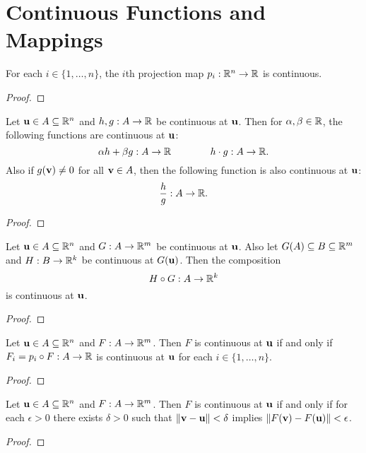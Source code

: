\documentclass[letterpaper, twoside, 12pt]{book}
\begin{document}
\section{Continuous Functions and Mappings}

\begin{proposition}[11.1]
  For each \(i\in\{1,\dots,n\}\), the \(i\)th projection map
  \(p_i:\mathbb R^n\to\mathbb R\) is continuous.
\end{proposition}
\begin{proof}

\end{proof}

\begin{theorem}[11.3]
  Let \(\mathbf u\in A\subseteq \mathbb R^n\) and \(h,g:A\to\mathbb R\) be continuous
  at \(\mathbf u\). Then for \(\alpha,\beta\in\mathbb R\), the following functions
  are continuous at \(\mathbf u\):
  \[
    \alpha h+\beta g : A\to\mathbb R
      \hspace{4em}
    h\cdot g : A\to\mathbb R
  .\]
  Also if \(g(\mathbf v)\not=0\) for all \(\mathbf v\in A\), then the following
  function is also continuous at \(\mathbf u\):
  \[
    \frac{h}{g} : A\to\mathbb R
  .\]
\end{theorem}
\begin{proof}

\end{proof}

\begin{theorem}[11.5]
  Let \(\mathbf u\in A\subseteq \mathbb R^n\) and \(G: A\to\mathbb R^m\) be continuous
  at \(\mathbf u\). Also let \(G(A)\subseteq B\subseteq \mathbb R^m\) and
  \(H:B\to\mathbb R^k\) be continuous at \(G(\mathbf u)\). Then the composition
  \[
    H\circ G : A\to\mathbb R^k
  \]
  is continuous at \(\mathbf u\).
\end{theorem}
\begin{proof}

\end{proof}

\begin{theorem}
  Let \(\mathbf u\in A\subseteq \mathbb R^n\) and \(F:A\to\mathbb R^m\).
  Then \(F\) is continuous at \(\mathbf u\) if and only if
  \(F_i=p_i\circ F:A\to\mathbb R\) is continuous at \(\mathbf u\) for each
  \(i\in\{1,\dots,n\}\).
\end{theorem}
\begin{proof}

\end{proof}

\begin{theorem}[11.11, Exercise 12]
  Let \(\mathbf u\in A\subseteq \mathbb R^n\) and \(F:A\to\mathbb R^m\).
  Then \(F\) is continuous at \(\mathbf u\) if and only if for each
  \(\epsilon>0\) there exists \(\delta>0\) such that
  \(\|\mathbf v-\mathbf u\|<\delta\)
  implies \(\|F(\mathbf v)-F(\mathbf u)\|<\epsilon\).
\end{theorem}
\begin{proof}

\end{proof}
\end{document}
